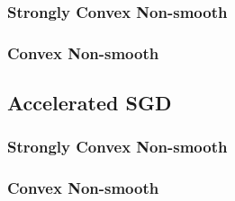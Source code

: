 \subsubsection{Strongly Convex Non-smooth}
\label{sec:sgdscvxnonsmth}

\subsubsection{Convex Non-smooth}
\label{sec:sgdcvxnonsmth}


\subsection{Accelerated SGD}
\subsubsection{Strongly Convex Non-smooth}
\label{sec:nasgdscvxnonsmth}

\subsubsection{Convex Non-smooth}
\label{sec:nasgdcvxnonsmth}



